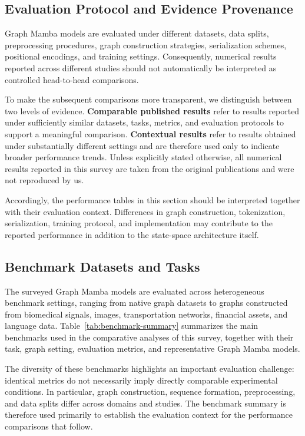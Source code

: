 \documentclass[acmsmall]{acmart}
\begin{document}
\subsection{Evaluation Protocol and Evidence Provenance}
\label{sec:evidence-protocol}

Graph Mamba models are evaluated under different datasets, data splits,
preprocessing procedures, graph construction strategies, serialization
schemes, positional encodings, and training settings. Consequently, numerical
results reported across different studies should not automatically be
interpreted as controlled head-to-head comparisons.

To make the subsequent comparisons more transparent, we distinguish between
two levels of evidence. \textbf{Comparable published results} refer to results
reported under sufficiently similar datasets, tasks, metrics, and evaluation
protocols to support a meaningful comparison. \textbf{Contextual results}
refer to results obtained under substantially different settings and are
therefore used only to indicate broader performance trends. Unless explicitly
stated otherwise, all numerical results reported in this survey are taken from
the original publications and were not reproduced by us.

Accordingly, the performance tables in this section should be interpreted
together with their evaluation context. Differences in graph construction,
tokenization, serialization, training protocol, and implementation may
contribute to the reported performance in addition to the state-space
architecture itself.

\subsection{Benchmark Datasets and Tasks}
\label{sec:benchmarks}

The surveyed Graph Mamba models are evaluated across heterogeneous benchmark
settings, ranging from native graph datasets to graphs constructed from
biomedical signals, images, transportation networks, financial assets, and
language data. Table~\ref{tab:benchmark-summary} summarizes the main benchmarks
used in the comparative analyses of this survey, together with their task,
graph setting, evaluation metrics, and representative Graph Mamba models.

The diversity of these benchmarks highlights an important evaluation
challenge: identical metrics do not necessarily imply directly comparable
experimental conditions. In particular, graph construction, sequence
formation, preprocessing, and data splits differ across domains and
studies. The benchmark summary is therefore used primarily to establish the
evaluation context for the performance comparisons that follow.
\end{document}
